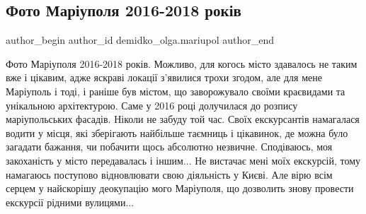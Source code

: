  
 
 
 
 

\subsection{Фото Маріуполя 2016-2018 років}
\label{sec:27_04_2023.fb.demidko_olga.mariupol.1.foto_mariupolja_2016_2018_rokiv}

\ifcmt
 author_begin
   author_id demidko_olga.mariupol
 author_end
\fi

Фото Маріуполя 2016-2018 років. Можливо, для когось місто здавалось не таким
вже і цікавим, адже яскраві локації з'явилися трохи згодом, але для мене
Маріуполь і тоді, і раніше був містом, що заворожувало своїми краєвидами та
унікальною архітектурою.  Саме у 2016 році долучилася до розпису маріупольських
фасадів. Ніколи не забуду той час. Своїх екскурсантів намагалася водити у
місця, які зберігають найбільше таємниць і цікавинок, де можна було загадати
бажання, чи побачити щось абсолютно незвичне. Сподіваюсь, моя закоханість у
місто передавалась і іншим... Не вистачає мені моїх екскурсій, тому намагаюсь
поступово відновлювати свою діяльність у Києві. Але вірю всім серцем у
найскорішу деокупацію мого  Маріуполя, що дозволить знову провести екскурсії
рідними вулицями...🙏💙💛

